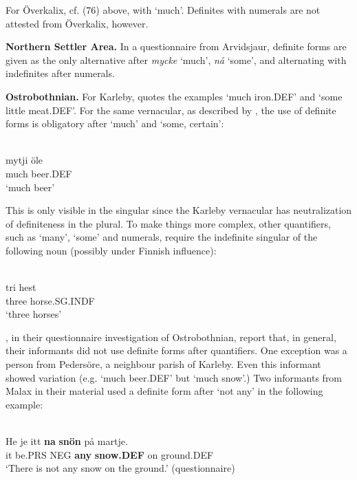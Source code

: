 \z

For Överkalix, cf. (76) above, with ‘much’. Definites with numerals are not attested from Överkalix, however.

\textbf{Northern Settler Area. }In a questionnaire from Arvidsjaur, definite forms are given as the only alternative after \textit{mycke} ‘much’, \textit{nå} ‘some’, and alternating with indefinites after numerals.

\textbf{Ostrobothnian.} For Karleby, \citet[94]{Hagfors1891} quotes the examples  ‘much iron.DEF’ and  ‘some little meat.DEF’. For the same vernacular, as described by \citet{Vangsnes2003}, the use of definite forms is obligatory after  ‘much’ and  ‘some, certain’:

\ea \label{} 
\\
\gll mytji  öle\\
much  beer.DEF\\
\glt ‘much beer’

\z

This is only visible in the singular since the Karleby vernacular has neutralization of definiteness in the plural. To make things more complex, other quantifiers, such as  ‘many’,  ‘some’ and numerals, require the indefinite singular of the following noun (possibly under Finnish influence):

\ea \label{} 
\\
\gll tri  hest\\
three  horse.SG.INDF\\
\glt ‘three horses’

\z

\citet[26]{ErikssonEtAl1999}, in their questionnaire investigation of Ostrobothnian, report that, in general, their informants did not use definite forms after quantifiers. One exception was a person from Pedersöre, a neighbour parish of Karleby. Even this informant showed variation (e.g.  ‘much beer.DEF’ but  ‘much snow’.) Two informants from Malax in their material used a definite form after  ‘not any’ in the following example:

\ea \label{} 
\\
\gll He  je  itt  \textbf{na} \textbf{snön} på  martje.\\
it  be.PRS  NEG  \textbf{any} \textbf{snow.DEF} on  ground.DEF\\
\glt ‘There is not any snow on the ground.’ (questionnaire)

